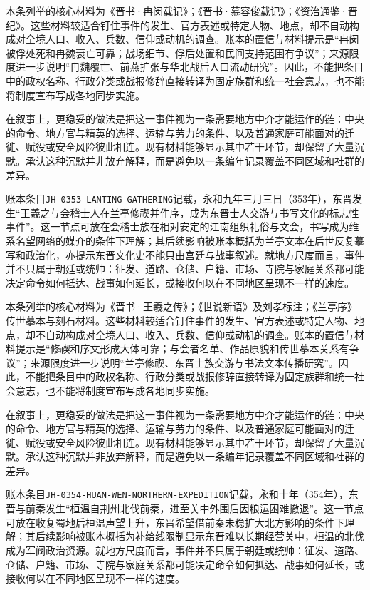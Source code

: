 本条列举的核心材料为《晋书·冉闵载记》；《晋书·慕容俊载记》；《资治通鉴·晋纪》。这些材料较适合钉住事件的发生、官方表述或特定人物、地点，却不自动构成对全境人口、收入、兵数、信仰或动机的调查。账本的置信与材料提示是“冉闵被俘处死和冉魏衰亡可靠；战场细节、俘后处置和民间支持范围有争议”；来源限度进一步说明“冉魏覆亡、前燕扩张与华北战后人口流动研究”。因此，不能把条目中的政权名称、行政分类或战报修辞直接转译为固定族群和统一社会意志，也不能将制度宣布写成各地同步实施。

在叙事上，更稳妥的做法是把这一事件视为一条需要地方中介才能运作的链：中央的命令、地方官与精英的选择、运输与劳力的条件、以及普通家庭可能面对的迁徙、赋役或安全风险彼此相连。现有材料能够显示其中若干环节，却保留了大量沉默。承认这种沉默并非放弃解释，而是避免以一条编年记录覆盖不同区域和社群的差异。

账本条目\texttt{JH-0353-LANTING-GATHERING}记载，永和九年三月三日（353年），东晋发生“王羲之与会稽士人在兰亭修禊并作序，成为东晋士人交游与书写文化的标志性事件”。这一节点可放在会稽士族在相对安定的江南组织礼俗与文会，书写成为维系名望网络的媒介的条件下理解；其后续影响被账本概括为兰亭文本在后世反复摹写和政治化，亦提示东晋文化史不能只由宫廷与战事叙述。就地方尺度而言，事件并不只属于朝廷或统帅：征发、道路、仓储、户籍、市场、寺院与家庭关系都可能决定命令如何抵达、战事如何延长，或接收何以在不同地区呈现不一样的速度。

本条列举的核心材料为《晋书·王羲之传》；《世说新语》及刘孝标注；《兰亭序》传世摹本与刻石材料。这些材料较适合钉住事件的发生、官方表述或特定人物、地点，却不自动构成对全境人口、收入、兵数、信仰或动机的调查。账本的置信与材料提示是“修禊和序文形成大体可靠；与会者名单、作品原貌和传世摹本关系有争议”；来源限度进一步说明“兰亭修禊、东晋士族交游与书法文本传播研究”。因此，不能把条目中的政权名称、行政分类或战报修辞直接转译为固定族群和统一社会意志，也不能将制度宣布写成各地同步实施。

在叙事上，更稳妥的做法是把这一事件视为一条需要地方中介才能运作的链：中央的命令、地方官与精英的选择、运输与劳力的条件、以及普通家庭可能面对的迁徙、赋役或安全风险彼此相连。现有材料能够显示其中若干环节，却保留了大量沉默。承认这种沉默并非放弃解释，而是避免以一条编年记录覆盖不同区域和社群的差异。

账本条目\texttt{JH-0354-HUAN-WEN-NORTHERN-EXPEDITION}记载，永和十年（354年），东晋与前秦发生“桓温自荆州北伐前秦，进至关中外围后因粮运困难撤退”。这一节点可放在收复蜀地后桓温声望上升，东晋希望借前秦未稳扩大北方影响的条件下理解；其后续影响被账本概括为补给线限制显示东晋难以长期经营关中，桓温的北伐成为军阀政治资源。就地方尺度而言，事件并不只属于朝廷或统帅：征发、道路、仓储、户籍、市场、寺院与家庭关系都可能决定命令如何抵达、战事如何延长，或接收何以在不同地区呈现不一样的速度。

